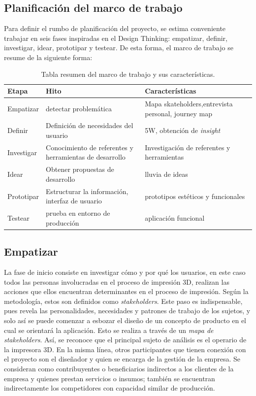 \subsection{Planificación del marco de trabajo}

Para definir el rumbo de planificación del proyecto, se estima conveniente trabajar en seis fases inspiradas en el Design Thinking: empatizar, definir, investigar, idear, prototipar y testear. De esta forma, el marco de trabajo se resume de la siguiente forma:

\begin{table}[H]
\centering
\begin{tabular}{|p{3.5cm}|p{3.5cm}|p{3.5cm}|}
\hline
Etapa & Hito & Características \\
\hline
Empatizar & detectar problemática & Mapa skateholders,entrevista personal, journey map \\
\hline
Definir & Definición de necesidades del usuario & 5W, obtención de \textit{insight}\\
\hline
Investigar & Conocimiento de referentes y herramientas de desarrollo & Investigación de referentes y herramientas \\
\hline
Idear & Obtener propuestas de desarrollo & lluvia de ideas \\
\hline
Prototipar & Estructurar la información, interfaz de usuario & prototipos estéticos y funcionales \\
\hline
Testear & prueba en entorno de producción & aplicación funcional \\
\hline

\end{tabular}
\caption{Tabla resumen del marco de trabajo y sus características.}
\end{table}

\subsection{Empatizar}

La fase de inicio consiste en investigar cómo y por qué los usuarios, en este caso todos las personas involucradas en el proceso de impresión 3D, realizan las acciones que ellos encuentran determinantes en el proceso de impresión. Según la metodología, estos son definidos como \textit{stakeholders}. Este paso es indispensable, pues revela las personalidades, necesidades y patrones de trabajo de los sujetos, y solo así se puede comenzar a esbozar el diseño de un concepto de producto en el cual se orientará la aplicación. Esto se realiza a través de un \textit{mapa de stakeholders}. Así, se reconoce que el principal sujeto de análisis es el operario de la impresora 3D. En la misma línea, otros participantes que tienen conexión con el proyecto son el diseñador y quien se encarga de la gestión de la empresa. Se consideran como contribuyentes o beneficiarios indirectos a los clientes de la empresa y quienes prestan servicios o insumos; también se encuentran indirectamente los competidores con capacidad similar de producción.


